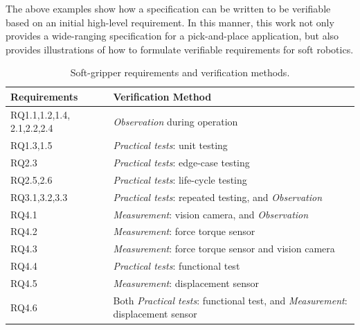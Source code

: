 \documentclass[letterpaper, 10 pt, conference]{ieeeconf}  %
\begin{document}
	The above examples show how a specification can be written to be verifiable based on an initial high-level requirement.
	In this manner, this work not only provides a wide-ranging specification for a pick-and-place application, but also provides illustrations of how to formulate verifiable requirements for soft robotics. %
 
	
	\begin{table}%
		\centering
		\caption{\label{Table:Verifiability} Soft-gripper requirements and verification methods.}
		\begin{tabular}{|p{16mm}|p{65mm}|}
			\hline
			\textbf{Requirements} & \textbf{Verification Method} \\ 
			\hline
			RQ1.1,1.2,1.4, 2.1,2.2,2.4 & \emph{Observation} during operation\\%
			\hline
			RQ1.3,1.5 & \emph{Practical tests}: unit testing  \\
			\hline
			RQ2.3 & \emph{Practical tests}: edge-case testing \\
			\hline
			RQ2.5,2.6 & \emph{Practical tests}: life-cycle testing \\
			\hline
			RQ3.1,3.2,3.3 & \emph{Practical tests}: repeated testing, and \emph{Observation} \\
			\hline
			RQ4.1 & \emph{Measurement}: vision camera, and \emph{Observation}  \\ 
			\hline
			RQ4.2 & \emph{Measurement}: force torque sensor \\ 
			\hline
			RQ4.3 & \emph{Measurement}: force torque sensor and vision camera  \\ 
			\hline
			RQ4.4 & \emph{Practical tests}: functional test\\ 
			\hline
			RQ4.5 & \emph{Measurement}: displacement sensor   \\ 
			\hline
			RQ4.6 & Both \emph{Practical tests}: functional test, and \emph{Measurement}: displacement sensor \\ 
			\hline
		\end{tabular}\vspace{-2.7ex}
	\end{table}
\end{document}
